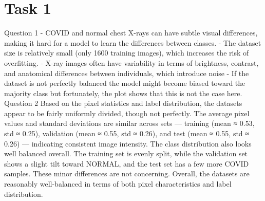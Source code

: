 \section{Task 1}
Question 1
-	COVID and normal chest X-rays can have subtle visual differences, making it hard for a model to learn the differences between classes.
-	The dataset size is relatively small (only 1600 training images), which increases the risk of overfitting.
-	X-ray images often have variability in terms of brightness, contrast, and anatomical differences between individuals, which introduce noise
-	If the dataset is not perfectly balanced the model might become biased toward the majority class but fortunately, the plot shows that this is not the case here.
Question 2
Based on the pixel statistics and label distribution, the datasets appear to be fairly uniformly divided, though not perfectly. The average pixel values and standard deviations are similar across sets — training (mean ≈ 0.53, std ≈ 0.25), validation (mean ≈ 0.55, std ≈ 0.26), and test (mean ≈ 0.55, std ≈ 0.26) — indicating consistent image intensity. The class distribution also looks well balanced overall. The training set is evenly split, while the validation set shows a slight tilt toward NORMAL, and the test set has a few more COVID samples. These minor differences are not concerning. Overall, the datasets are reasonably well-balanced in terms of both pixel characteristics and label distribution.
